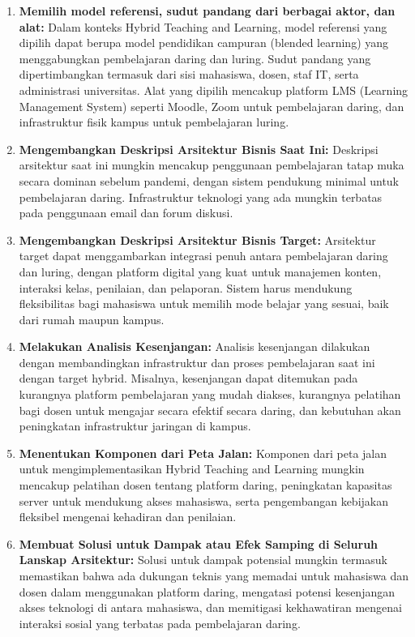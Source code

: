 \begin{enumerate}
	\item \textbf{Memilih model referensi, sudut pandang dari berbagai aktor, dan alat:}  
	Dalam konteks Hybrid Teaching and Learning, model referensi yang dipilih dapat berupa model pendidikan campuran (blended learning) yang menggabungkan pembelajaran daring dan luring. Sudut pandang yang dipertimbangkan termasuk dari sisi mahasiswa, dosen, staf IT, serta administrasi universitas. Alat yang dipilih mencakup platform LMS (Learning Management System) seperti Moodle, Zoom untuk pembelajaran daring, dan infrastruktur fisik kampus untuk pembelajaran luring.
	
	\item \textbf{Mengembangkan Deskripsi Arsitektur Bisnis Saat Ini:}  
	Deskripsi arsitektur saat ini mungkin mencakup penggunaan pembelajaran tatap muka secara dominan sebelum pandemi, dengan sistem pendukung minimal untuk pembelajaran daring. Infrastruktur teknologi yang ada mungkin terbatas pada penggunaan email dan forum diskusi.
	
	\item \textbf{Mengembangkan Deskripsi Arsitektur Bisnis Target:}  
	Arsitektur target dapat menggambarkan integrasi penuh antara pembelajaran daring dan luring, dengan platform digital yang kuat untuk manajemen konten, interaksi kelas, penilaian, dan pelaporan. Sistem harus mendukung fleksibilitas bagi mahasiswa untuk memilih mode belajar yang sesuai, baik dari rumah maupun kampus.
	
	\item \textbf{Melakukan Analisis Kesenjangan:}  
	Analisis kesenjangan dilakukan dengan membandingkan infrastruktur dan proses pembelajaran saat ini dengan target hybrid. Misalnya, kesenjangan dapat ditemukan pada kurangnya platform pembelajaran yang mudah diakses, kurangnya pelatihan bagi dosen untuk mengajar secara efektif secara daring, dan kebutuhan akan peningkatan infrastruktur jaringan di kampus.
	
	\item \textbf{Menentukan Komponen dari Peta Jalan:}  
	Komponen dari peta jalan untuk mengimplementasikan Hybrid Teaching and Learning mungkin mencakup pelatihan dosen tentang platform daring, peningkatan kapasitas server untuk mendukung akses mahasiswa, serta pengembangan kebijakan fleksibel mengenai kehadiran dan penilaian.
	
	\item \textbf{Membuat Solusi untuk Dampak atau Efek Samping di Seluruh Lanskap Arsitektur:}  
	Solusi untuk dampak potensial mungkin termasuk memastikan bahwa ada dukungan teknis yang memadai untuk mahasiswa dan dosen dalam menggunakan platform daring, mengatasi potensi kesenjangan akses teknologi di antara mahasiswa, dan memitigasi kekhawatiran mengenai interaksi sosial yang terbatas pada pembelajaran daring.
	

\end{enumerate}
